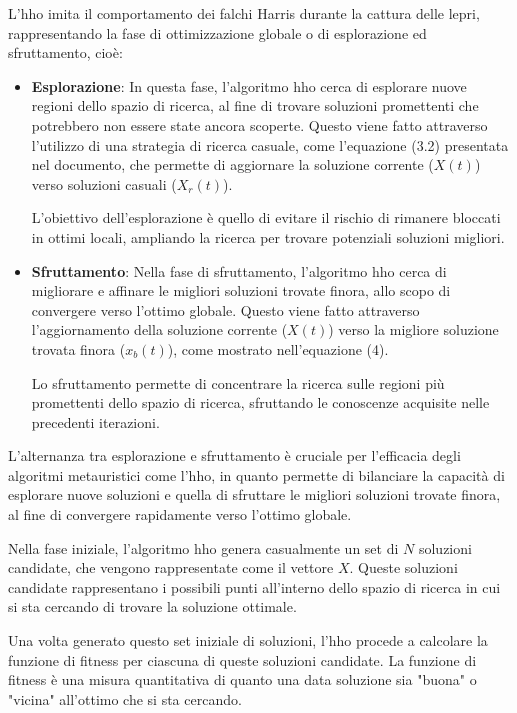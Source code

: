 L'\gls{hho} imita il comportamento dei falchi Harris durante la cattura delle lepri, rappresentando la fase di ottimizzazione globale o di esplorazione ed sfruttamento, cioè:

\begin{itemize}
      \item \textbf{Esplorazione}: In questa fase, l'algoritmo \gls{hho} cerca di esplorare nuove regioni dello spazio di ricerca, al fine di trovare soluzioni promettenti che potrebbero non essere state ancora scoperte. Questo viene fatto attraverso l'utilizzo di una strategia di ricerca casuale, come l'equazione (3.2) presentata nel documento, che permette di aggiornare la soluzione corrente ($X(t)$) verso soluzioni casuali ($X_r(t)$).

      L'obiettivo dell'esplorazione è quello di evitare il rischio di rimanere bloccati in ottimi locali, ampliando la ricerca per trovare potenziali soluzioni migliori.

      \item \textbf{Sfruttamento}: Nella fase di sfruttamento, l'algoritmo \gls{hho} cerca di migliorare e affinare le migliori soluzioni trovate finora, allo scopo di convergere verso l'ottimo globale. Questo viene fatto attraverso l'aggiornamento della soluzione corrente ($X(t)$) verso la migliore soluzione trovata finora ($x_b(t)$), come mostrato nell'equazione (4).
      
      Lo sfruttamento permette di concentrare la ricerca sulle regioni più promettenti dello spazio di ricerca, sfruttando le conoscenze acquisite nelle precedenti iterazioni. 

\end{itemize}

L'alternanza tra esplorazione e sfruttamento è cruciale per l'efficacia degli algoritmi metauristici come l'\gls{hho}, in quanto permette di bilanciare la capacità di esplorare nuove soluzioni e quella di sfruttare le migliori soluzioni trovate finora, al fine di convergere rapidamente verso l'ottimo globale.

Nella fase iniziale, l'algoritmo \gls{hho} genera casualmente un set di $N$ soluzioni candidate, che vengono rappresentate come il vettore $X$. Queste soluzioni candidate rappresentano i possibili punti all'interno dello spazio di ricerca in cui si sta cercando di trovare la soluzione ottimale.

Una volta generato questo set iniziale di soluzioni, l'\gls{hho} procede a calcolare la funzione di fitness per ciascuna di queste soluzioni candidate. La funzione di fitness è una misura quantitativa di quanto una data soluzione sia "buona" o "vicina" all'ottimo che si sta cercando.

